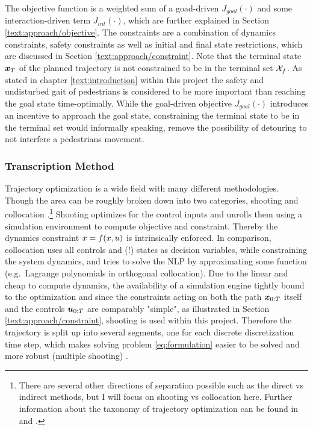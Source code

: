 The objective function is a weighted sum of a goad-driven $J_{goal}(\cdot)$ and some interaction-driven term $J_{int}(\cdot)$, which are further explained in Section \ref{text:approach/objective}. The constraints are a combination of dynamics constraints, safety constraints as well as initial and final state restrictions, which are discussed in Section \ref{text:approach/constraint}. Note that the terminal state $\boldsymbol{x}_T$ of the planned trajectory is not constrained to be in the terminal set $\mathcal{X}_f$. As stated in chapter \ref{text:introduction} within this project the safety and undisturbed gait of pedestrians is considered to be more important than reaching the goal state time-optimally. While the goal-driven objective $J_{goal}(\cdot)$ introduces an incentive to approach the goal state, constraining the terminal state to be in the terminal set would informally speaking, remove the possibility of detouring to not interfere a pedestrians movement. 

\subsubsection{Transcription Method} 
Trajectory optimization is a wide field with many different methodologies. Though the area can be roughly broken down into two categories, shooting and collocation \cite{Kelly2017}.\footnote{There are several other directions of separation possible such as the direct vs indirect methods, but I will focus on shooting vs collocation here. Further information about the taxonomy of trajectory optimization can be found in \cite{Kelly2017} and \cite{Chai2020}.} Shooting optimizes for the control inputs and unrolls them using a simulation environment to compute objective and constraint. Thereby the dynamics constraint $x = f(x, u)$ is intrinsically enforced. In comparison, collocation uses all controls and (!) states as decision variables, while constraining the system dynamics, and tries to solve the \ac{NLP} by approximating some function (e.g.\ Lagrange polynomials in orthogonal collocation). Due to the linear and cheap to compute dynamics, the availability of a simulation engine tightly bound to the optimization and since the constraints acting on both the path $\boldsymbol{x}_{0:T}$ itself and the controls $\boldsymbol{u}_{0:T}$ are comparably "simple", as illustrated in Section \ref{text:approach/constraint}, shooting is used within this project. Therefore the trajectory is split up into several segments, one for each discrete discretization time step, which makes solving problem \ref{eq:formulation} easier to be solved and more robust (multiple shooting) \cite{Betts1998}.

